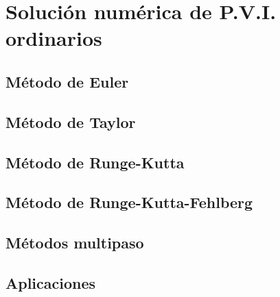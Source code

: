 \chapter[Solución numérica de problemas de valor inicial con ecuaciones diferenciales ordinarias]{Solución numérica de P.V.I. ordinarios}

\section{Método de Euler}

\section{Método de Taylor}

\section{Método de Runge-Kutta}

\section{Método de Runge-Kutta-Fehlberg}

\section{Métodos multipaso}

\section{Aplicaciones}